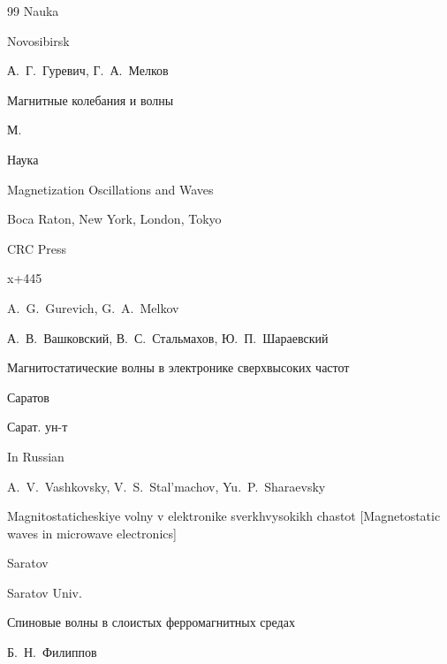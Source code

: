 \begin{thebibliography}{99}
\publ Nauka

\publaddr Novosibirsk






\by А.~Г.~Гуревич, Г.~А.~Мелков

\book Магнитные колебания и волны 

\publaddr М. 

\publ Наука 



\transl 

\book Magnetization Oscillations and Waves


\publaddr Boca Raton, New York, London, Tokyo

\publ CRC Press

\totalpages x+445

\by A.~G.~Gurevich, G.~A.~Melkov 




\by  А.~В.~Вашковский, В.~С.~Стальмахов, Ю.~П.~Шараевский 

\book Магнитостатические волны в электронике сверхвысоких частот 

\publaddr Саратов 

\publ Сарат. ун-т



\misctransl

\lang In Russian

\by A.~V.~Vashkovsky, V.~S.~Stal'machov, Yu.~P.~Sharaevsky  

\book Magnitostaticheskiye volny v elektronike sverkhvysokikh chastot \rm [Magnetostatic waves in microwave electronics]

\publaddr Saratov

\publ Saratov Univ.








\paper Спиновые волны в слоистых ферромагнитных средах  

\by Б.~Н.~Филиппов 


\end{thebibliography}
